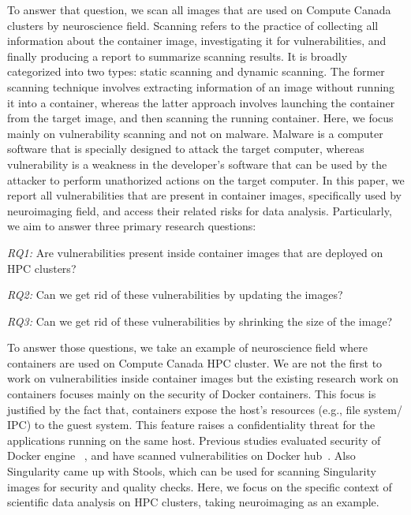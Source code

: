 \documentclass[a4paper,num-refs]{oup-contemporary}
\begin{document}
To answer that question, we scan all images that are used on Compute
Canada clusters by neuroscience field. Scanning refers to the practice of
collecting all information about the container image, investigating it
for vulnerabilities, and finally producing a
report to summarize scanning results. It is broadly categorized into
two types: static scanning and dynamic scanning. The former scanning technique
involves extracting information of an image without running it into a container,
whereas the latter approach involves launching the container from the target image, and
then scanning the running container.
Here, we focus mainly on vulnerability scanning and not on malware.
Malware is a computer software that is specially designed to attack the target computer,
whereas vulnerability is a weakness in the developer's software that can be used
by the attacker to perform unathorized actions on the target computer.
In this paper, we report all vulnerabilities that are present in
container images, specifically used by neuroimaging field, and access their
related risks for data analysis. Particularly, we aim to answer three primary
research questions:

\textit{RQ1:} Are vulnerabilities present inside container images that are
deployed on HPC clusters?

\textit{RQ2:} Can we get rid of these vulnerabilities by updating the
images?

\textit{RQ3:} Can we get rid of these vulnerabilities by shrinking the
size of the image?

To answer those questions, we take an example of neuroscience field where
containers are used on Compute Canada HPC cluster.
We are not the first to work on vulnerabilities inside container images but
the existing research work on containers focuses mainly on the security of Docker
containers.
This focus is justified by the fact that, containers expose the host's resources
(e.g., file system/ IPC) to the guest system. This feature raises a confidentiality
threat for the applications running on the same host. Previous studies evaluated
security of Docker engine ~\cite{martin2018docker, sultan2019container, combe2016docker, bui2015analysis},
and have scanned vulnerabilities on Docker hub~\cite{Shu2017, gummaraju2015over}.
Also Singularity came up with Stools, which can be used for scanning Singularity images
for security and quality checks.
Here, we focus on the specific context of scientific data analysis on HPC clusters, taking
neuroimaging as an example.
\end{document}

